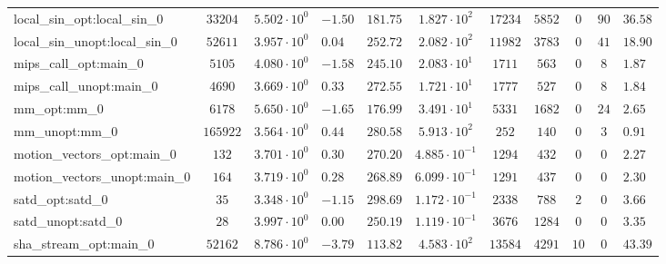 \begin{tabular}{|l|c|HHc|c|c|c|c|cH|}
local\_sin\_opt:local\_sin\_0                   & $ 33204    $ & $ 5.502 \cdot 10^{0} $ & $ -1.50 $ & $ 181.75 $ & $ 1.827 \cdot 10^{2}  $ & $ 17234  $ & $ 5852  $ & $ 0   $ & $ 90  $ & $ 36.58   $ \\
local\_sin\_unopt:local\_sin\_0                 & $ 52611    $ & $ 3.957 \cdot 10^{0} $ & $ 0.04  $ & $ 252.72 $ & $ 2.082 \cdot 10^{2}  $ & $ 11982  $ & $ 3783  $ & $ 0   $ & $ 41  $ & $ 18.90   $ \\
mips\_call\_opt:main\_0                         & $ 5105     $ & $ 4.080 \cdot 10^{0} $ & $ -1.58 $ & $ 245.10 $ & $ 2.083 \cdot 10^{1}  $ & $ 1711   $ & $ 563   $ & $ 0   $ & $ 8   $ & $ 1.87    $ \\
mips\_call\_unopt:main\_0                       & $ 4690     $ & $ 3.669 \cdot 10^{0} $ & $ 0.33  $ & $ 272.55 $ & $ 1.721 \cdot 10^{1}  $ & $ 1777   $ & $ 527   $ & $ 0   $ & $ 8   $ & $ 1.84    $ \\
mm\_opt:mm\_0                                   & $ 6178     $ & $ 5.650 \cdot 10^{0} $ & $ -1.65 $ & $ 176.99 $ & $ 3.491 \cdot 10^{1}  $ & $ 5331   $ & $ 1682  $ & $ 0   $ & $ 24  $ & $ 2.65    $ \\
mm\_unopt:mm\_0                                 & $ 165922   $ & $ 3.564 \cdot 10^{0} $ & $ 0.44  $ & $ 280.58 $ & $ 5.913 \cdot 10^{2}  $ & $ 252    $ & $ 140   $ & $ 0   $ & $ 3   $ & $ 0.91    $ \\
motion\_vectors\_opt:main\_0                    & $ 132      $ & $ 3.701 \cdot 10^{0} $ & $ 0.30  $ & $ 270.20 $ & $ 4.885 \cdot 10^{-1} $ & $ 1294   $ & $ 432   $ & $ 0   $ & $ 0   $ & $ 2.27    $ \\
motion\_vectors\_unopt:main\_0                  & $ 164      $ & $ 3.719 \cdot 10^{0} $ & $ 0.28  $ & $ 268.89 $ & $ 6.099 \cdot 10^{-1} $ & $ 1291   $ & $ 437   $ & $ 0   $ & $ 0   $ & $ 2.30    $ \\
satd\_opt:satd\_0                               & $ 35       $ & $ 3.348 \cdot 10^{0} $ & $ -1.15 $ & $ 298.69 $ & $ 1.172 \cdot 10^{-1} $ & $ 2338   $ & $ 788   $ & $ 2   $ & $ 0   $ & $ 3.66    $ \\
satd\_unopt:satd\_0                             & $ 28       $ & $ 3.997 \cdot 10^{0} $ & $ 0.00  $ & $ 250.19 $ & $ 1.119 \cdot 10^{-1} $ & $ 3676   $ & $ 1284  $ & $ 0   $ & $ 0   $ & $ 3.35    $ \\
sha\_stream\_opt:main\_0                        & $ 52162    $ & $ 8.786 \cdot 10^{0} $ & $ -3.79 $ & $ 113.82 $ & $ 4.583 \cdot 10^{2}  $ & $ 13584  $ & $ 4291  $ & $ 10  $ & $ 0   $ & $ 43.39   $ \\

\end{tabular}
